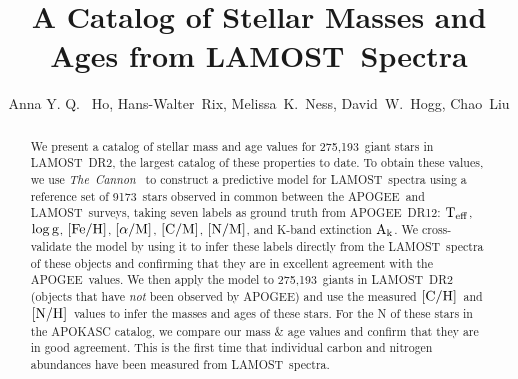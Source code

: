 \documentclass[12pt, preprint]{aastex}
\newcommand{\tc}{\textsl{The~Cannon}}
\newcommand{\apogee}{APOGEE}
\newcommand{\lamost}{LAMOST}
\newcommand{\teff}{\mbox{$\rm T_{eff}$}}
\newcommand{\logg}{\mbox{$\rm \log g$}}
\newcommand{\feh}{\mbox{$\rm [Fe/H]$}}
\newcommand{\alpham}{\mbox{$\rm [\alpha/M]$}}
\newcommand{\cm}{\mbox{$\rm [C/M]$}}
\newcommand{\carbon}{\mbox{$\rm [C/H]$}}
\newcommand{\nitrogen}{\mbox{$\rm [N/H]$}}
\newcommand{\nm}{\mbox{$\rm [N/M]$}}
\newcommand{\ak}{\mbox{$\rm A_k$}}
\newcommand{\ntrobj}{9173}
\newcommand{\ntestobj}{275,193}
\begin{document}
\title{A Catalog of Stellar Masses and Ages from \lamost\ Spectra}
\author{Anna Y. Q. ~Ho,
Hans-Walter~Rix,
Melissa~K.~Ness,
David~W.~Hogg, 
Chao~Liu
}


\begin{abstract}

We present a catalog of stellar mass and age values
for \ntestobj\ giant stars in \lamost\ DR2,
the largest catalog of these properties to date.
To obtain these values, we use \tc\ \citep{Ness2015}
to construct a predictive model for \lamost\ spectra 
using a reference set of \ntrobj\ stars observed in common 
between the \apogee\ and \lamost\ surveys,
taking seven labels as ground truth from \apogee\ DR12:
\teff, \logg, \feh, \alpham, \cm, \nm, 
and K-band extinction \ak.
We cross-validate the model by using it to infer these labels 
directly from the \lamost\ spectra of these objects
and confirming that they are in excellent agreement
with the \apogee\ values.
We then apply the model to \ntestobj\ giants
in \lamost\ DR2 (objects that have \emph{not} been observed by \apogee)
and use the measured \carbon\ and \nitrogen\ 
values to infer the masses and ages of these stars.
For the N of these stars in the APOKASC catalog,
we compare our mass \& age values and confirm that they
are in good agreement.
This is the first time that individual carbon and nitrogen
abundances have been measured from \lamost\ spectra.

\end{abstract}

\end{document}
